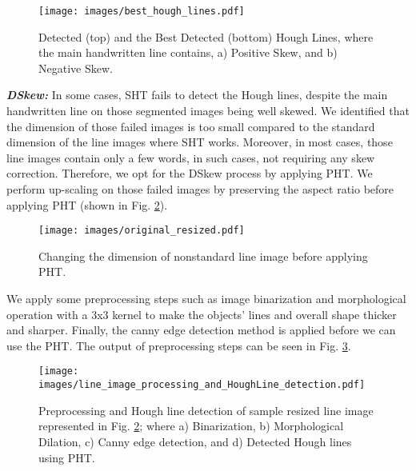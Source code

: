 \documentclass[runningheads]{llncs}
\begin{document}
\begin{figure}
\centering
\vspace{-4mm}
\texttt{[image: images/best\_hough\_lines.pdf]}
\vspace{-6mm}
\caption{Detected (top) and the Best Detected (bottom) Hough Lines, where the main handwritten line contains, a) Positive Skew, and b) Negative Skew.} 
\label{drishti-fig5}
\vspace{-4mm}
\end{figure}

\noindent \textbf{\textit{DSkew:}} In some cases, SHT fails to detect the Hough lines, despite the main handwritten line on those segmented images being well skewed. We identified that the dimension of those failed images is too small compared to the standard dimension of the line images where SHT works. Moreover, in most cases, those line images contain only a few words, in such cases, not requiring any skew correction. Therefore, we opt for the DSkew process by applying PHT. We perform up-scaling on those failed images by preserving the aspect ratio before applying PHT (shown in Fig. \ref{drishti-fig6}).

\begin{figure}
\centering
\vspace{-6mm}
\texttt{[image: images/original\_resized.pdf]}
\vspace{-6mm}
\caption{Changing the dimension of nonstandard line image before applying PHT.} 
\label{drishti-fig6}
\vspace{-4mm}
\end{figure}

\noindent We apply some preprocessing steps such as image binarization and morphological operation with a 3x3 kernel to make the objects' lines and overall shape thicker and sharper. Finally, the canny edge detection method is applied before we can use the PHT. The output of preprocessing steps can be seen in Fig. \ref{drishti-fig7}.


\begin{figure}
\vspace{-4mm}
\centering
\texttt{[image: images/line\_image\_processing\_and\_HoughLine\_detection.pdf]}
\vspace{-6mm}
\caption{Preprocessing and Hough line detection of sample resized line image represented in Fig. \ref{drishti-fig6}; where a) Binarization, b) Morphological Dilation, c) Canny edge detection, and d) Detected Hough lines using PHT.} 
\label{drishti-fig7}
\vspace{-4mm}
\end{figure}
\end{document}
